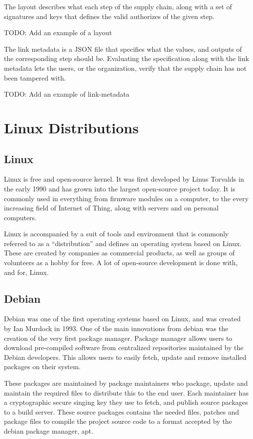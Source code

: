 \documentclass[../Main/thesis.tex]{subfiles}
\begin{document}
    The layout describes what each step of the supply chain, along with a set of
    signatures and keys that defines the valid authorizes of the given step.

    TODO: Add an example of a layout

    The link metadata is a JSON file that specifies what the values, and outputs
    of the corresponding step should be. Evaluating the specification along with
    the link metadata lets the users, or the organization, verify that the
    supply chain has not been tampered with. 

    TODO: Add an example of link-metadata

\section{Linux Distributions}\label{sec:linux_distributions}
    \subsection*{Linux}
    Linux is free and open-source kernel. It was first developed by Linus
    Torvalds in the early 1990 and has grown into the largest open-source
    project today. It is commonly used in everything from firmware modules on a
    computer, to the every increasing field of Internet of Thing, along with
    servers and on personal computers.

    Linux is accompanied by a suit of tools and environment that is commonly
    referred to as a ``distribution'' and defines an operating system based on
    Linux. These are created by companies as commercial products, as well as
    groups of volunteers as a hobby for free. A lot of open-source development
    is done with, and for, Linux.

    \subsection*{Debian}
    Debian was one of the first operating systems based on Linux, and was
    created by Ian Murdock in 1993. One of the main innovations from debian was
    the creation of the very first package manager. Package manager allows users
    to download pre-compiled software from centralized repositories maintained
    by the Debian developers.  This allows users to easily fetch, update and
    remove installed packages on their system.

    These packages are maintained by package maintainers who package, update and
    maintain the required files to distribute this to the end user. Each
    maintainer has a cryptographic secure singing key they use to fetch, and
    publish source packages to a build server. These source packages contains
    the needed files, patches and package files to compile the project source
    code to a format accepted by the debian package manager, apt.
\end{document}
